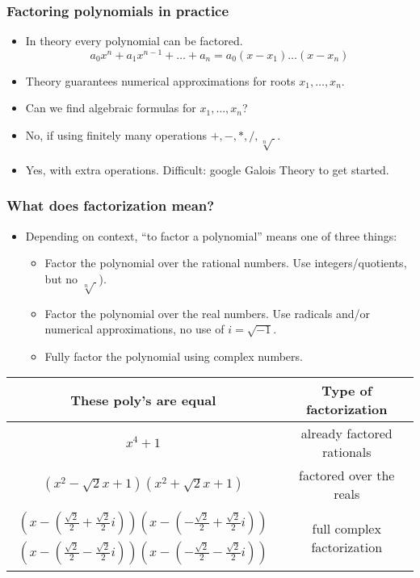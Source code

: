 \begin{frame}
\frametitle{Factoring polynomials in practice}
\begin{itemize}
\item In theory every polynomial can be factored.
\[a_0 x^{n}+a_1x^{n-1}+\dots + a_n=a_0 (x-x_1)\dots (x-x_n)
\]
\item Theory guarantees numerical approximations for roots $x_1,\dots, x_n$. 
\item Can we find algebraic formulas for $x_1, \dots, x_n$?
\item No, if using finitely many operations $+,-,*,/,\sqrt[n]{~}$. 
\item \footnotesize{ Yes, with extra operations. Difficult: google Galois Theory to get started.}
\end{itemize}
\end{frame}
\begin{frame}
\frametitle{What does factorization mean?}
\begin{itemize}
\item Depending on context, ``to factor a polynomial'' means one of three things:
\begin{itemize}
\item  Factor the polynomial over the rational numbers. Use integers/quotients, but no $\sqrt[n]{~}$).
\item Factor the polynomial over the real numbers. Use radicals and/or numerical approximations, no use of $i=\sqrt{-1}$.
\item Fully factor the polynomial using complex numbers.
\end{itemize}
\end{itemize}
\begin{tabular}{|c|c|}\hline
These poly's are equal&Type of factorization\\\hline
$x^4+1$& already factored rationals\\\hline
$(x^2-\sqrt{2}x+1)(x^2+\sqrt{2}x+1)$& factored over the reals\\\hline
$\begin{array}{r}
\left(x-\left(\frac{\sqrt{2}}{2}+\frac{\sqrt{2}}{2}i\right)\right)
\left(x-\left(-\frac{\sqrt{2}}{2}+\frac{\sqrt{2}}{2}i\right)\right)\\
\left(x-\left(\frac{\sqrt{2}}{2}-\frac{\sqrt{2}}{2}i\right)\right)
\left(x-\left(-\frac{\sqrt{2}}{2}-\frac{\sqrt{2}}{2}i\right)\right)
\end{array}$& full complex factorization\\\hline
\end{tabular}


\end{frame}